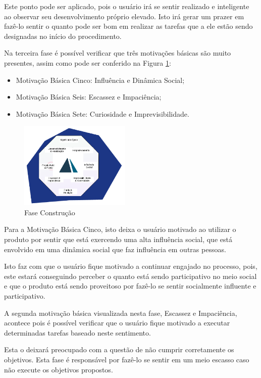 Este ponto pode ser aplicado, pois o usuário irá se sentir realizado e inteligente
ao observar seu desenvolvimento próprio elevado. Isto irá gerar um prazer em fazê-lo
sentir o quanto pode ser bom em realizar as tarefas que a ele estão sendo designadas
no início do procedimento.

Na terceira fase é possível verificar que três motivações básicas são muito presentes,
assim como pode ser conferido na Figura \ref{fig:faseconstrucao}:



\begin{itemize}
    \item Motivação Básica Cinco: Influência e Dinâmica Social;
    \item Motivação Básica Seis: Escassez e Impaciência;
    \item Motivação Básica Sete: Curiosidade e Imprevisibilidade.
\end{itemize}

\begin{figure}[h]
    \centering
    \includegraphics[width=200px, scale=1]{figuras/faseconstrucao}
    \caption{Fase Construção}
    \label{fig:faseconstrucao}
\end{figure}


Para a Motivação Básica Cinco, isto deixa o usuário motivado ao utilizar o produto
por sentir que está exercendo uma alta influência social, que está envolvido em
uma dinâmica social que faz influência em outras pessoas.

Isto faz com que o usuário fique motivado a continuar engajado no processo, pois,
este estará conseguindo perceber o quanto está sendo participativo no meio social
e que o produto está sendo proveitoso por fazê-lo se sentir socialmente influente
e participativo.


A segunda motivação básica visualizada nesta fase, Escassez e Impaciência, acontece
pois é possível verificar que o usuário fique motivado a executar determinadas
tarefas baseado neste sentimento.

Esta o deixará preocupado com a questão de não cumprir corretamente os objetivos.
Esta fase é responsável por fazê-lo se sentir em um meio escasso caso não execute
os objetivos propostos.

